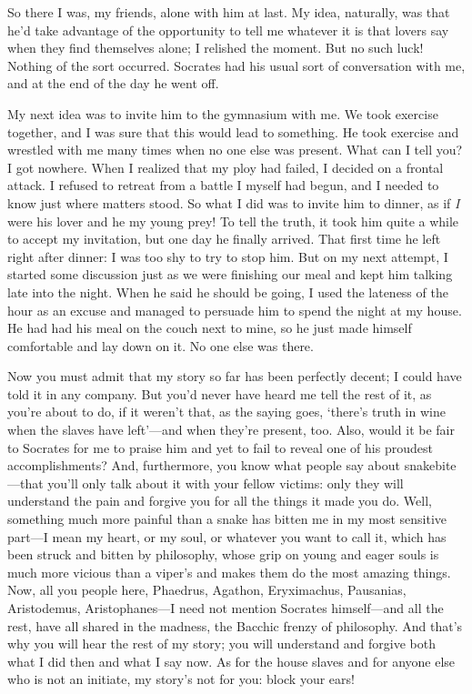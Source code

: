 So there I was, my friends, alone with him at last. My idea, naturally,
was that he’d take advantage of the opportunity to tell me whatever it
is that lovers say when they find themselves alone; I relished the
moment. But no such luck! Nothing of the sort occurred. Socrates had his
usual sort of conversation with me, and at the end of the day he went
off. 

My next idea was to invite him to the gymnasium with me. We took
exercise together, and I was sure that this would lead to something. He
took exercise and wrestled with me many times when no one else was
present. What can I tell you? I got nowhere. When I realized that my
ploy had failed, I decided on a frontal attack. I refused to retreat
from a battle I myself had begun, and I needed to know just where
matters stood. So what I did was to invite him to dinner, as if {\em I}
were his lover and he my young prey! To tell the truth, it took him
quite a while to accept my  invitation, but one day he finally
arrived. That first time he left right after dinner: I was too shy to
try to stop him. But on my next attempt, I started some discussion just
as we were finishing our meal and kept him talking late into the night.
When he said he should be going, I used the lateness of the hour as an
excuse and managed to persuade him to spend the night at my house. He
had had his meal on the couch next to mine, so he just made himself
comfortable and lay down on it. No one else was there. 

Now you must admit that my story so far has been perfectly decent; I
could have told it in any company. But you’d never have heard me tell
the rest of it, as you’re about to do, if it weren’t that, as the saying
goes, ‘there’s truth in wine when the slaves have left’---and when
they’re present, too. Also, would it be fair to Socrates for me to
praise him and yet to fail to reveal one of his proudest
accomplishments? And, furthermore, you know what people say about
snakebite---that you’ll only talk about it with your fellow victims:
only they will understand the pain and forgive you for
all the things it made you do. Well, something much more painful than a
snake has bitten me in my most sensitive part---I mean my heart, or my
soul, or whatever you want to call it, which has been struck and bitten
by philosophy, whose grip on young and eager souls is much more vicious
than a viper’s and makes them do the most amazing things. Now, 
all you people here, Phaedrus, Agathon, Eryximachus, Pausanias,
Aristodemus, Aristophanes---I need not mention Socrates himself---and
all the rest, have all shared in the madness, the Bacchic frenzy of
philosophy. And that’s why you will hear the rest of my story; you will
understand and forgive both what I did then and what I say now. As for
the house slaves and for anyone else who is not an initiate, my story’s
not for you: block your ears!

